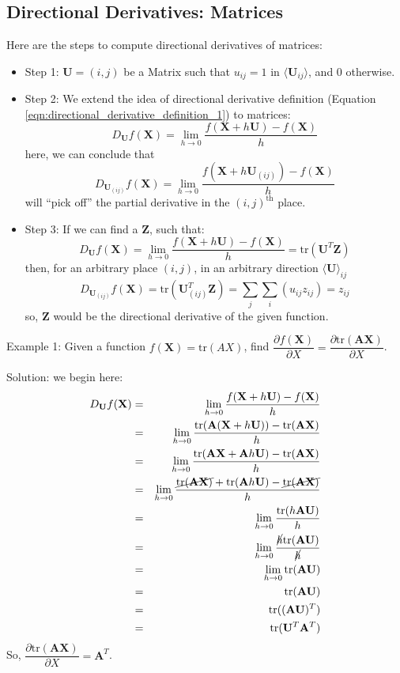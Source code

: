 \documentclass[conference,final,11pt,technote,onecolumn]{IEEEtran}\usepackage[]{graphicx}\usepackage[]{color}
\begin{document}
\subsection{Directional Derivatives: Matrices}
Here are the steps to compute directional derivatives of matrices\cite{pres:withoutATrace}:
\begin{itemize}
	\item Step 1: $\mathbf{U}=(i,j)$ be a Matrix such that $u_{ij}=1$ in $\langle \mathbf{U}_{ij}\rangle$, and 0 otherwise.
	\item Step 2: We extend the idea of directional derivative definition (Equation \ref{eqn:directional_derivative_definition_1}) to matrices:
	\[ D_{\mathbf{U}}f(\mathbf{X}) = \lim_{h\rightarrow 0}\dfrac{f(\mathbf{X}+h\mathbf{U})-f(\mathbf{X})}{h}\]
	here, we can conclude that
	\[ D_{\mathbf{U}_{(ij)}}f(\mathbf{X}) = \lim_{h\rightarrow 0}\dfrac{f(\mathbf{X}+h\mathbf{U}_{(ij)})-f(\mathbf{X})}{h}\]
	will ``pick off'' the partial derivative in the $(i,j)^\text{th}$ place.
	\item Step 3: If we can find a $\mathbf{Z}$, such that:
	\[ D_{\mathbf{U}}f(\mathbf{X}) = \lim_{h\rightarrow 0}\dfrac{f(\mathbf{X}+h\mathbf{U})-f(\mathbf{X})}{h} = \text{tr}(\mathbf{U}^T\mathbf{Z})\]
	then, for an arbitrary place $(i,j)$, in an arbitrary direction $\langle \mathbf{U}\rangle_{ij}$ \[ D_{\mathbf{U}_{(ij)}}f(\mathbf{X}) =  \text{tr}(\mathbf{U}^T_{(ij)}\mathbf{Z}) = \sum_j\sum_i(u_{ij}z_{ij}) = z_{ij}\]
	so, $\mathbf{Z}$ would be the directional derivative of the given function.
\end{itemize}
Example 1: Given a function $f(\mathbf{X}) = \text{tr}(AX)$, find $\dfrac{\partial f(\mathbf{X})}{\partial X} = \dfrac{\partial \text{tr}(\mathbf{AX})}{\partial X}$.

Solution: we begin here:
\begin{eqnarray}
\nonumber D_\mathbf{U}f(\mathbf{X}) &=& \lim_{h\rightarrow 0}\dfrac{f(\mathbf{X}+h\mathbf{U})-f(\mathbf{X})}{h}\\
\nonumber &=& \lim_{h\rightarrow 0}\dfrac{\text{tr}(\mathbf{A}(\mathbf{X}+h\mathbf{U}))-\text{tr}(\mathbf{AX})}{h}\\
\nonumber &=& \lim_{h\rightarrow 0}\dfrac{\text{tr}(\mathbf{A}\mathbf{X}+\mathbf{A}h\mathbf{U})-\text{tr}(\mathbf{AX})}{h}\\
\nonumber &=& \lim_{h\rightarrow 0}\dfrac{\cancel{\text{tr}(\mathbf{A}\mathbf{X})}+\text{tr}(\mathbf{A}h\mathbf{U})-\cancel{\text{tr}(\mathbf{AX})}}{h}\\
\nonumber &=& \lim_{h\rightarrow 0}\dfrac{\text{tr}(h\mathbf{A}\mathbf{U})}{h}\\
\nonumber &=& \lim_{h\rightarrow 0}\dfrac{\cancel{h}\text{tr}(\mathbf{A}\mathbf{U})}{\cancel{h}}\\
\nonumber &=& \lim_{h\rightarrow 0}\text{tr}(\mathbf{AU})\\
\nonumber &=& \text{tr}(\mathbf{AU})\\
\nonumber &=& \text{tr}((\mathbf{AU})^T)\\
\nonumber &=& \text{tr}(\mathbf{U}^T\mathbf{A}^T)
\end{eqnarray}
So, $\dfrac{\partial \text{tr}(\mathbf{AX})}{\partial X} = \mathbf{A}^T$.
\end{document}
